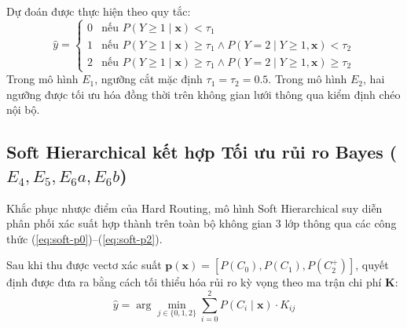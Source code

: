 Dự đoán được thực hiện theo quy tắc:
\begin{equation}
    \hat{y} = \begin{cases} 0 & \text{nếu } P(Y \ge 1 \mid \mathbf{x}) < \tau_1 \\ 1 & \text{nếu } P(Y \ge 1 \mid \mathbf{x}) \ge \tau_1 \land P(Y = 2 \mid Y \ge 1, \mathbf{x}) < \tau_2 \\ 2 & \text{nếu } P(Y \ge 1 \mid \mathbf{x}) \ge \tau_1 \land P(Y = 2 \mid Y \ge 1, \mathbf{x}) \ge \tau_2 \end{cases}
\end{equation}
Trong mô hình $E_1$, ngưỡng cắt mặc định $\tau_1 = \tau_2 = 0.5$. Trong mô hình $E_2$, hai ngưỡng được tối ưu hóa đồng thời trên không gian lưới thông qua kiểm định chéo nội bộ.

\subsection{Soft Hierarchical kết hợp Tối ưu rủi ro Bayes ($E_4, E_5, E_6a, E_6b$)}
Khắc phục nhược điểm của Hard Routing, mô hình Soft Hierarchical suy diễn phân phối xác suất hợp thành trên toàn bộ không gian 3 lớp thông qua các công thức (\ref{eq:soft-p0})--(\ref{eq:soft-p2}).

Sau khi thu được vectơ xác suất $\mathbf{p}(\mathbf{x}) = [P(C_0), P(C_1), P(C_2^+)]$, quyết định được đưa ra bằng cách tối thiểu hóa rủi ro kỳ vọng theo ma trận chi phí $\mathbf{K}$:
\begin{equation}
    \hat{y} = \arg\min_{j \in \{0, 1, 2\}} \sum_{i=0}^2 P(C_i \mid \mathbf{x}) \cdot K_{ij}
\end{equation}

